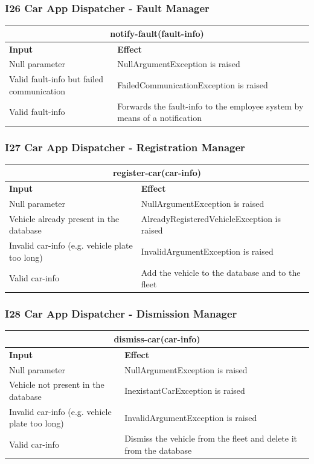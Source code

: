 \documentclass{article}
\begin{document}
\subsubsection{I26 Car App Dispatcher - Fault Manager}
\begin{tabular}{ |p{5cm}|p{7cm}| }
  \hline
  \multicolumn{2}{|c|}{notify-fault(fault-info)} \\
  \hline
  \textbf{Input} & \textbf{Effect} \\
  \hline
  Null parameter & NullArgumentException is raised\\
  \hline
  Valid fault-info but failed communication & FailedCommunicationException is raised\\
  \hline
  Valid fault-info & Forwards the fault-info to the employee system by means of a notification\\
  \hline
\end{tabular}
\subsubsection{I27 Car App Dispatcher - Registration Manager}
\begin{tabular}{ |p{5cm}|p{7cm}| }
  \hline
  \multicolumn{2}{|c|}{register-car(car-info)} \\
  \hline
  \textbf{Input} & \textbf{Effect} \\
  \hline
  Null parameter & NullArgumentException is raised\\
  \hline
  Vehicle already present in the database & AlreadyRegisteredVehicleException is raised\\
  \hline
  Invalid car-info (e.g. vehicle plate too long) & InvalidArgumentException is raised\\
  \hline
  Valid car-info & Add the vehicle to the database and to the fleet\\
  \hline
\end{tabular}
\subsubsection{I28 Car App Dispatcher - Dismission Manager}
\begin{tabular}{ |p{5cm}|p{7cm}| }
  \hline
  \multicolumn{2}{|c|}{dismiss-car(car-info)} \\
  \hline
  \textbf{Input} & \textbf{Effect} \\
  \hline
  Null parameter & NullArgumentException is raised\\
  \hline
  Vehicle not present in the database & InexistantCarException is raised\\
  \hline
  Invalid car-info (e.g. vehicle plate too long) & InvalidArgumentException is raised\\
  \hline
  Valid car-info & Dismiss the vehicle from the fleet and delete it from the database\\
  \hline
\end{tabular}
\end{document}
